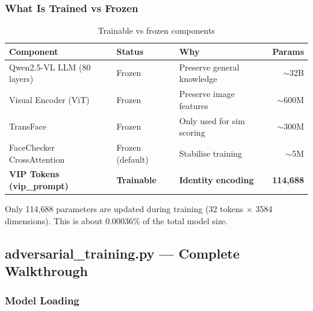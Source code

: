 \documentclass[12pt,a4paper]{article}
\begin{document}
\subsubsection{What Is Trained vs Frozen}

\begin{table}[H]
\centering
\caption{Trainable vs frozen components}
\begin{tabular}{@{}lllr@{}}
\toprule
\textbf{Component} & \textbf{Status} & \textbf{Why} & \textbf{Params} \\
\midrule
Qwen2.5-VL LLM (80 layers) & Frozen & Preserve general knowledge & $\sim$32B \\
Visual Encoder (ViT) & Frozen & Preserve image features & $\sim$600M \\
TransFace & Frozen & Only used for sim scoring & $\sim$300M \\
FaceChecker CrossAttention & Frozen (default) & Stabilise training & $\sim$5M \\
\textbf{VIP Tokens (vip\_prompt)} & \textbf{Trainable} & \textbf{Identity encoding} & \textbf{114,688} \\
\bottomrule
\end{tabular}
\end{table}

Only 114,688 parameters are updated during training (32 tokens $\times$ 3584 dimensions). This is about 0.00036\% of the total model size.

\subsection{adversarial\_training.py --- Complete Walkthrough}

\subsubsection{Model Loading}
\end{document}
